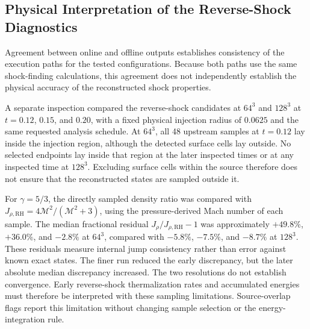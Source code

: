\subsection{Physical Interpretation of the Reverse-Shock Diagnostics}
\label{subsec:reverse_sampling_limits}

Agreement between online and offline outputs establishes consistency of the
execution paths for the tested configurations. Because both paths use the
same shock-finding calculations, this agreement does not independently
establish the physical accuracy of the reconstructed shock properties.

A separate inspection compared the reverse-shock candidates at $64^3$ and
$128^3$ at $t=0.12$, $0.15$, and $0.20$, with a fixed physical injection
radius of $0.0625$ and the same requested analysis schedule. At $64^3$,
all 48 upstream samples at $t=0.12$ lay inside the injection region, although
the detected surface cells lay outside. No selected endpoints lay inside
that region at the later inspected times or at any inspected time at $128^3$.
Excluding surface cells within the source therefore does not ensure that
the reconstructed states are sampled outside it.

For $\gamma=5/3$, the directly sampled density ratio was compared with
$J_{\rho,\mathrm{RH}}=4\mathcal{M}^2/(\mathcal{M}^2+3)$, using the
pressure-derived Mach number of each sample. The median fractional residual
$J_\rho/J_{\rho,\mathrm{RH}}-1$ was approximately $+49.8\%$, $+36.0\%$,
and $-2.8\%$ at $64^3$, compared with $-5.8\%$, $-7.5\%$, and $-8.7\%$
at $128^3$. These residuals measure internal jump consistency rather than
error against known exact states. The finer run reduced the early discrepancy,
but the later absolute median discrepancy increased. The two resolutions
do not establish convergence. Early reverse-shock thermalization rates and
accumulated energies must therefore be interpreted with these sampling
limitations. Source-overlap flags report this limitation without changing
sample selection or the energy-integration rule.

